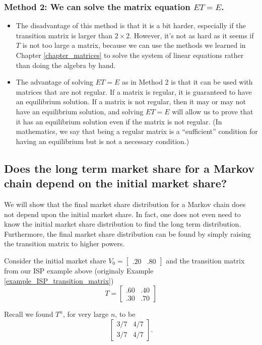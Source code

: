 \subsubsection*{Method 2: We can solve the matrix equation \( ET = E \).}
\begin{itemize}
    \item The disadvantage of this method is that it is a bit harder, especially if the transition matrix is larger than \( 2 \times 2 \). However, it’s not as hard as it seems if \( T \) is not too large a matrix, because we can use the methods we learned in Chapter \ref{chapter_matrices} to solve the system of linear equations rather than doing the algebra by hand.
    \item The advantage of solving \( ET = E \) as in Method 2 is that it can be used with matrices that are not regular. If a matrix is regular, it is guaranteed to have an equilibrium solution. If a matrix is not regular, then it may or may not have an equilibrium solution, and solving \( ET = E \) will allow us to prove that it has an equilibrium solution even if the matrix is not regular. (In mathematics, we say that being a regular matrix is a “sufficient” condition for having an equilibrium but is not a necessary condition.)
\end{itemize}

\subsection{Does the long term market share for a Markov chain depend on the initial market share?}

We will show that the final market share distribution for a Markov chain does not depend upon the initial market share.   In fact, one does not even need to know the initial market share distribution to find the long term distribution. Furthermore, the final market share distribution can be found by simply raising the transition matrix to higher powers.

Consider the initial market share \( V_0=\begin{bmatrix} .20 & .80 \end{bmatrix} \) and the transition matrix from our ISP example above (originaly Example \ref{example_ISP_transition_matrix})
\[
    T=     \begin{bmatrix}
        .60 & .40 \\
        .30 & .70
    \end{bmatrix}
\]

Recall we found \(T^n\), for very large \(n\), to be
\[
    \begin{bmatrix}
        3/7 & 4/7 \\
        3/7 & 4/7
    \end{bmatrix}.
\]

